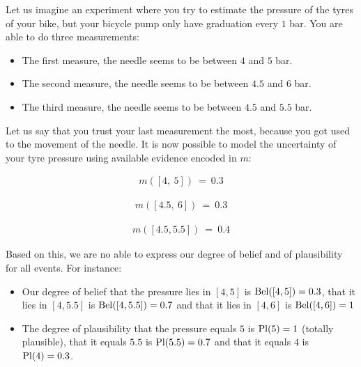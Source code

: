 \begin{example}\label{ex:bicycle_pressure}
    Let us imagine an experiment where you try to estimate the pressure of the tyres of your bike, but your bicycle pump only have graduation every $1$ bar. You are able to do three measurements:
    \begin{itemize}
        \item The first measure, the needle seems to be between $4$ and $5$ bar.
        \item The second measure, the needle seems to be between $4.5$ and $6$ bar.
        \item The third measure, the needle seems to be between $4.5$ and $5.5$ bar.
    \end{itemize}
    Let us say that you trust your last measurement the most, because you got used to the movement of the needle. It is now possible to model the uncertainty of your tyre pressure using available evidence encoded in $m$:\\
    \noindent
    \begin{minipage}{0.3\textwidth}
        \begin{align*}
            m([4,~5]) ~=~ 0.3
        \end{align*}
    \end{minipage}\hfill
    \begin{minipage}{0.3\textwidth}
        \begin{align*}
            m([4.5,~6]) ~=~ 0.3
        \end{align*}
    \end{minipage}\hfill
    \begin{minipage}{0.3\textwidth}
        \begin{align*}
             m([4.5,5.5]) ~=~ 0.4
        \end{align*}
    \end{minipage}\par
    Based on this, we are no able to express our degree of belief and of plausibility for all events. For instance:
    \begin{itemize}
        \item Our degree of belief that the pressure lies in $[4, 5]$ is ${\mathrm{Bel}}([4, 5])=0.3$, that it lies in $[4, 5.5]$ is ${\mathrm{Bel}}([4, 5.5])=0.7$ and that it lies in $[4, 6]$ is ${\mathrm{Bel}}([4, 6])=1$
        \item The degree of plausibility that the pressure equals $5$ is ${\mathrm{Pl}} (5)=1$ (totally plausible), that it equals $5.5$ is ${\mathrm{Pl}} (5.5)=0.7$ and that it equals $4$ is ${\mathrm{Pl}} (4)=0.3$.
    \end{itemize}
\end{example}

